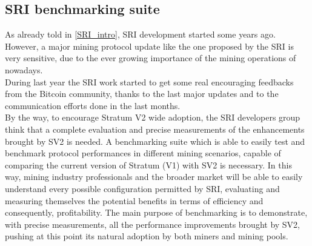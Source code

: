\subsection{SRI benchmarking suite}
As already told in \ref{SRI_intro}, SRI development started some years ago. However, a major mining protocol update like the one proposed by the SRI is very sensitive, due to the ever growing importance of the mining operations of nowadays.\\
During last year the SRI work started to get some real encouraging feedbacks from the Bitcoin community, thanks to the last major updates and to the communication efforts done in the last months.\\

\noindent By the way, to encourage Stratum V2 wide adoption, the SRI developers group think that a complete evaluation and precise measurements of the enhancements brought by SV2 is needed. A benchmarking suite which is able to easily test and benchmark protocol performances in different mining scenarios, capable of comparing the current version of Stratum (V1) with SV2 is necessary. In this way, mining industry professionals and the broader market will be able to easily understand every possible configuration permitted by SRI, evaluating and measuring themselves the potential benefits in terms of efficiency and consequently, profitability.
The main purpose of benchmarking is to demonstrate, with precise measurements, all the performance improvements brought by SV2, pushing at this point its natural adoption by both miners and mining pools.
